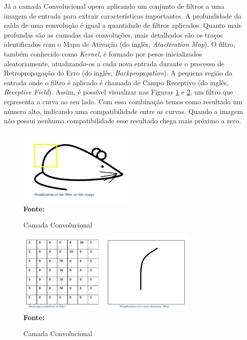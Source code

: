 Já a camada Convolucional opera aplicando um conjunto de filtros a uma imagem de entrada para extrair características importantes. A profundidade da saída de uma convolução é igual a quantidade de filtros aplicados. Quanto mais profundas são as camadas das convoluções, mais detalhados são os traços identificados com o Mapa de Ativação (do inglês, \textit{Atactivation Map}). O filtro, também conhecido como \textit{Kernel}, é formado por pesos inicializados aleatoriamente, atualizando-os a cada nova entrada durante o processo de Retropropagação do Erro (do inglês, \textit{Backpropagation}). A pequena região da entrada onde o filtro é aplicado é chamada de Campo Receptivo (do inglês, \textit{Receptive Field}). Assim, é possível visualizar nas Figuras \ref{fig:conv2} e \ref{fig:conv3}, um filtro que representa a curva ao seu lado. Com essa combinação temos como resultado um número alto, indicando uma compatibilidade entre as curvas. Quando a imagem não possui nenhuma compatibilidade esse resultado chega mais próximo a zero.

\begin{figure}[ht]
 	\centering	
 	\caption[\hspace{0.1cm}Grade Computacional.]{Camada Convolucional}
 	\vspace{-0.4cm}
 	\includegraphics[width=0.5\textwidth]{figuras/conv2.png}
 	\captionsetup{justification=centering}
	\vspace{-0.2cm}
     \\\textbf{\footnotesize Fonte: \cite{cnns}}
	\label{fig:conv2}
\end{figure}



\begin{figure}[ht]
 	\centering	
 	\caption[\hspace{0.1cm}Grade Computacional.]{Camada Convolucional}
 	\vspace{-0.4cm}
 	\includegraphics[width=0.8\textwidth]{figuras/conv3.png}
 	\captionsetup{justification=centering}
	\vspace{-0.2cm}
     \\\textbf{\footnotesize Fonte: \cite{cnns}}
	\label{fig:conv3}
\end{figure}

